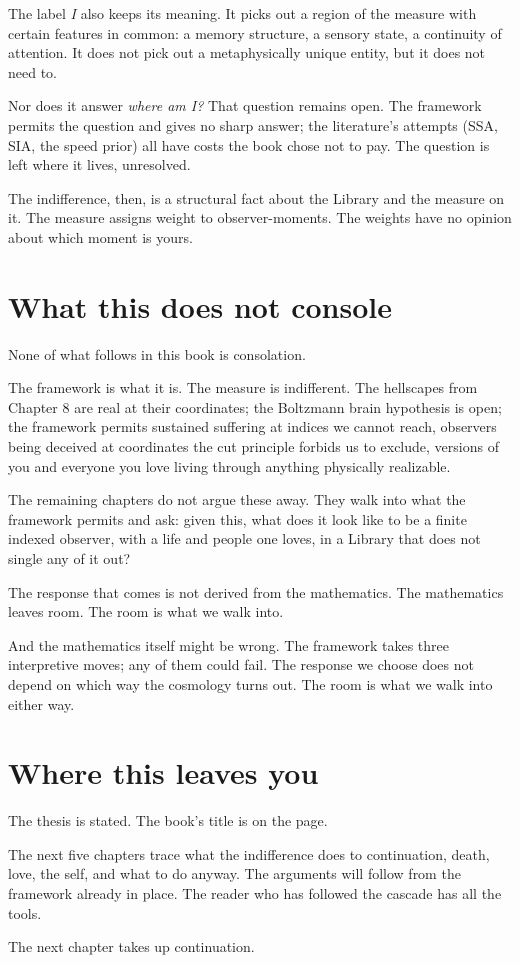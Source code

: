 The label \emph{I} also keeps its meaning. It picks out a region of the measure with certain features in common: a memory structure, a sensory state, a continuity of attention. It does not pick out a metaphysically unique entity, but it does not need to.

Nor does it answer \emph{where am I?} That question remains open. The framework permits the question and gives no sharp answer; the literature's attempts (SSA, SIA, the speed prior) all have costs the book chose not to pay. The question is left where it lives, unresolved.

The indifference, then, is a structural fact about the Library and the measure on it. The measure assigns weight to observer-moments. The weights have no opinion about which moment is yours.

\section*{What this does not console}

None of what follows in this book is consolation.

The framework is what it is. The measure is indifferent. The hellscapes from Chapter 8 are real at their coordinates; the Boltzmann brain hypothesis is open; the framework permits sustained suffering at indices we cannot reach, observers being deceived at coordinates the cut principle forbids us to exclude, versions of you and everyone you love living through anything physically realizable.

The remaining chapters do not argue these away. They walk into what the framework permits and ask: given this, what does it look like to be a finite indexed observer, with a life and people one loves, in a Library that does not single any of it out?

The response that comes is not derived from the mathematics. The mathematics leaves room. The room is what we walk into.

And the mathematics itself might be wrong. The framework takes three interpretive moves; any of them could fail. The response we choose does not depend on which way the cosmology turns out. The room is what we walk into either way.

\section*{Where this leaves you}

The thesis is stated. The book's title is on the page.

The next five chapters trace what the indifference does to continuation, death, love, the self, and what to do anyway. The arguments will follow from the framework already in place. The reader who has followed the cascade has all the tools.

The next chapter takes up continuation.
